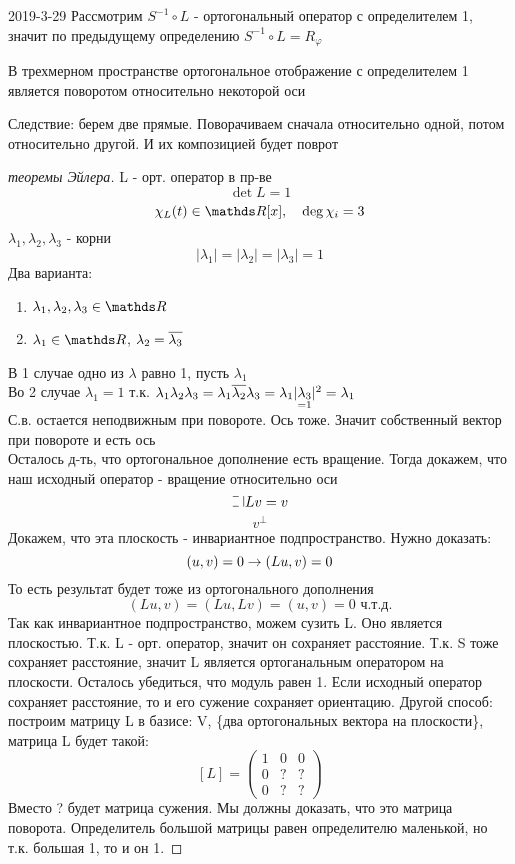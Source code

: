 \documentclass[main]{subfiles}
\begin{document}
\begin{lect}{2019-3-29}
    Рассмотрим $S^{-1} \circ L$ - ортогональный оператор с определителем 1, значит по предыдущему определению $S^{-1} \circ L = R_{\varphi}$

    \begin{utv}
      В трехмерном пространстве ортогональное отображение с определителем 1 является поворотом относительно некоторой оси
    \end{utv}

    Следствие: берем две прямые. Поворачиваем сначала относительно одной, потом относительно другой. И их композицией будет поврот

    \begin{proof}[теоремы Эйлера]
      L - орт. оператор в пр-ве
      \[\det L = 1\]
      \[\chi_L(t) \in \R[x],\q \deg \chi_i = 3\]
      $\lambda_1, \lambda_2, \lambda_3$ - корни
      \[|\lambda_1| = |\lambda_2| = |\lambda_3| = 1\]
      Два варианта:
      \begin{enumerate}
        \item $\lambda_1, \lambda_2, \lambda_3 \in \R$
        \item $\lambda_1 \in \R$, $\lambda_2 = \overline{\lambda_3}$
      \end{enumerate}
      В 1 случае одно из $\lambda$ равно 1, пусть $\lambda_1$\\
      Во 2 случае $\lambda_1 = 1$ т.к. $\lambda_1 \lambda_2 \lambda_3 = \lambda_1 \overline{\lambda_2} \lambda_3 = \lambda_1 |\underset{=1}{\lambda_3}|^2 = \lambda_1$\\
      С.в. остается неподвижным при повороте. Ось тоже. Значит собственный вектор  при повороте и есть ось\\
      Осталось д-ть, что ортогональное дополнение есть вращение. Тогда докажем, что наш исходный оператор - вращение относительно оси
      \[\letus Lv = v\]
      \[v^{\bot}\]
      Докажем, что эта плоскость - инвариантное подпространство. Нужно доказать:
      \[(u,v) = 0 \rightarrow (Lu, v) = 0\]
      То есть результат будет тоже из ортогонального дополнения
      \[(Lu,v) = (Lu, Lv) = (u,v) = 0 \text{ ч.т.д.}\]
      Так как инвариантное подпространство, можем сузить L. Оно является плоскостью. Т.к. L - орт. оператор, значит он сохраняет расстояние. Т.к. S тоже сохраняет расстояние, значит L является ортоганальным оператором на плоскости. Осталось убедиться, что модуль равен 1. Если исходный оператор сохраняет расстояние, то и его сужение сохраняет ориентацию. Другой способ: построим матрицу L в базисе: V, \{два ортогональных вектора на плоскости\}, матрица L будет такой:\\
      \[[L] = \begin{pmatrix}
        1 & 0 & 0\\
        0 & ? & ?\\
        0 & ? & ?
      \end{pmatrix}\]
      Вместо ? будет матрица сужения. Мы должны доказать, что это матрица поворота. Определитель большой матрицы равен определителю маленькой, но т.к. большая 1, то и он 1.


\end{proof}
\end{lect}
\end{document}
